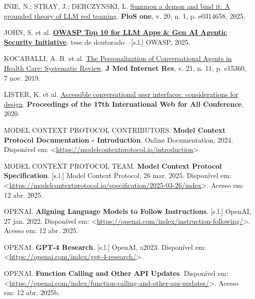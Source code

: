 \documentclass[
]{article}
\newlength{\cslhangindent}
\newenvironment{CSLReferences}[2] %
 {\begin{list}{}{%
  \setlength{\itemindent}{0pt}
  \setlength{\leftmargin}{0pt}
  \setlength{\parsep}{0pt}
  \ifodd #1
   \setlength{\leftmargin}{\cslhangindent}
   \setlength{\itemindent}{-1\cslhangindent}
  \fi
  \setlength{\itemsep}{#2\baselineskip}}}
 {\end{list}}
\begin{document}
\begin{CSLReferences}{0}{1}
INIE, N.; STRAY, J.; DERCZYNSKI, L.
\href{https://journals.plos.org/plosone/article?id=10.1371/journal.pone.0314658}{Summon
a demon and bind it: A grounded theory of LLM red teaming}. \textbf{PloS
one}, v. 20, n. 1, p. e0314658, 2025.

JOHN, S. et al.
\textbf{\href{https://genai.owasp.org/llmrisk/llm01-prompt-injection}{OWASP
Top 10 for LLM Apps \& Gen AI Agentic Security Initiative}}. tese de
doutorado---{[}s.l.{]} OWASP, 2025.

KOCABALLI, A. B. et al. \href{https://doi.org/10.2196/15360}{The
Personalization of Conversational Agents in Health Care: Systematic
Review}. \textbf{J Med Internet Res}, v. 21, n. 11, p. e15360, 7 nov.
2019.

LISTER, K. et al.
\href{https://api.semanticscholar.org/CorpusID:218539971}{Accessible
conversational user interfaces: considerations for design}.
\textbf{Proceedings of the 17th International Web for All Conference},
2020.

MODEL CONTEXT PROTOCOL CONTRIBUTORS. \textbf{{Model Context Protocol
Documentation - Introduction}}. Online Documentation, 2024. Disponível
em:
\textless{}\url{https://modelcontextprotocol.io/introduction}\textgreater{}

MODEL CONTEXT PROTOCOL TEAM. \textbf{Model Context Protocol
Specification}. {[}s.l.{]} Model Context Protocol, 26 mar. 2025.
Disponível em:
\textless{}\url{https://modelcontextprotocol.io/specification/2025-03-26/index}\textgreater.
Acesso em: 12 abr. 2025.

OPENAI. \textbf{Aligning Language Models to Follow Instructions}.
{[}s.l.{]} OpenAI, 27 jan. 2022. Disponível em:
\textless{}\url{https://openai.com/index/instruction-following/}\textgreater.
Acesso em: 12 abr. 2025.

OPENAI. \textbf{GPT-4 Research}. {[}s.l.{]} OpenAI, a2023. Disponível
em:
\textless{}\url{https://openai.com/index/gpt-4-research/}\textgreater.

OPENAI. \textbf{Function Calling and Other API Updates}. Disponível em:
\textless{}\url{https://openai.com/index/function-calling-and-other-api-updates/}\textgreater.
Acesso em: 12 abr. 2025b.


\end{CSLReferences}
\end{document}

